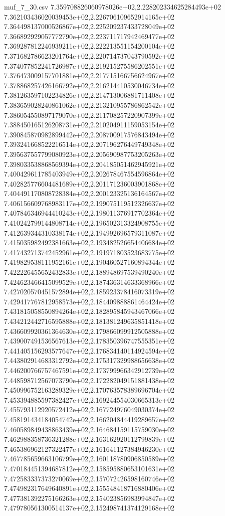 \begin{filecontents*}{muf_7_30.csv}
7.359708826060978026e+02,2.228202334625284493e+02
7.362103436020039453e+02,2.226706109652914165e+02
7.364498137000526867e+02,2.225209237433728049e+02
7.366892929057772790e+02,2.223711717942469477e+02
7.369287812246939211e+02,2.222213551154200104e+02
7.371682786623201764e+02,2.220714737043790592e+02
7.374077852241726987e+02,2.219215275586202551e+02
7.376473009157701881e+02,2.217715166756624967e+02
7.378868257426166792e+02,2.216214410530046734e+02
7.381263597102234826e+02,2.214713006881711408e+02
7.383659028240861062e+02,2.213210955786862542e+02
7.386054550897179070e+02,2.211708257220907399e+02
7.388450165126208731e+02,2.210204911159053154e+02
7.390845870982899442e+02,2.208700917576843494e+02
7.393241668522216514e+02,2.207196276449749348e+02
7.395637557799080923e+02,2.205690987753205263e+02
7.398033538868569394e+02,2.204185051462945921e+02
7.400429611785403949e+02,2.202678467554596864e+02
7.402825776604481689e+02,2.201171236003901868e+02
7.404491170808728384e+02,2.200123325136164567e+02
7.406156609768983117e+02,2.199075119512326637e+02
7.407846346944410243e+02,2.198011376917702364e+02
7.410242799144808714e+02,2.196502313324908755e+02
7.412639344310338174e+02,2.194992696579311087e+02
7.415035982492381663e+02,2.193482526654406684e+02
7.417432713742452961e+02,2.191971803523683775e+02
7.419829538111952161e+02,2.190460527160894344e+02
7.422226455652432833e+02,2.188948697539490240e+02
7.424623466415099529e+02,2.187436314633368966e+02
7.427020570451572894e+02,2.185923378416073319e+02
7.429417767812958573e+02,2.184409888861464424e+02
7.431815058550894264e+02,2.182895845943467066e+02
7.434212442716595888e+02,2.181381249635851418e+02
7.436609920361364630e+02,2.179866099912505888e+02
7.439007491536567613e+02,2.178350396747555351e+02
7.441405156293577647e+02,2.176834140114924594e+02
7.443802914683312792e+02,2.175317329988656638e+02
7.446200766757467591e+02,2.173799966342912739e+02
7.448598712567073790e+02,2.172282049151881438e+02
7.450996752163289329e+02,2.170763578389696704e+02
7.453394885597382427e+02,2.169244554030665313e+02
7.455793112920572412e+02,2.167724976049030374e+02
7.458191434184054742e+02,2.166204844419289657e+02
7.460589849438863439e+02,2.164684159115759030e+02
7.462988358736321288e+02,2.163162920112799839e+02
7.465386962127322477e+02,2.161641127384946230e+02
7.467785659663106799e+02,2.160118780906850589e+02
7.470184451394687812e+02,2.158595880653101631e+02
7.472583337373270069e+02,2.157072426598160746e+02
7.474982317649640891e+02,2.155548418716880406e+02
7.477381392275166263e+02,2.154023856983994847e+02
7.479780561300514137e+02,2.152498741374129168e+02

\end{filecontents*}
